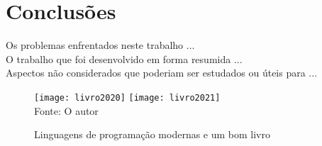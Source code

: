 

\chapter{Conclus\~{o}es}

Os problemas enfrentados neste trabalho ...\\
O trabalho que foi desenvolvido em forma resumida ...\\
Aspectos n\~{a}o considerados que poderiam ser estudados ou \'{u}teis para ...\\
\begin{figure}[H]
    \begin{center}
        \caption{Linguagens de programa\c{c}\~{a}o modernas e um bom livro} \label{ling2}
        \texttt{[image: livro2020]}
        \texttt{[image: livro2021]} \\
        {\tiny \sf Fonte: O autor }
    \end{center}
\end{figure}